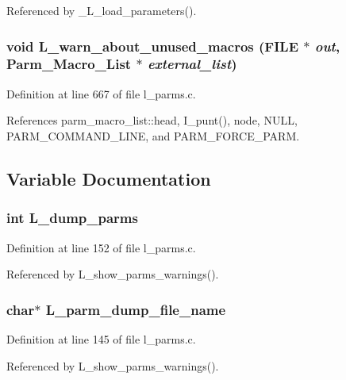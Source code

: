 Referenced by \_\-L\_\-load\_\-parameters().
\subsubsection{\setlength{\rightskip}{0pt plus 5cm}void L\_\-warn\_\-about\_\-unused\_\-macros (FILE $\ast$ {\em out}, \bf{Parm\_\-Macro\_\-List} $\ast$ {\em external\_\-list})}\label{l__parms_8h_da9f209c373bf33ecc8affd7d376b2d3}




Definition at line 667 of file l\_\-parms.c.

References parm\_\-macro\_\-list::head, I\_\-punt(), node, NULL, PARM\_\-COMMAND\_\-LINE, and PARM\_\-FORCE\_\-PARM.

\subsection{Variable Documentation}
\subsubsection{\setlength{\rightskip}{0pt plus 5cm}int \bf{L\_\-dump\_\-parms}}\label{l__parms_8h_d8b6ae8bcbc9ccc867100dfd96f6957c}




Definition at line 152 of file l\_\-parms.c.

Referenced by L\_\-show\_\-parms\_\-warnings().
\subsubsection{\setlength{\rightskip}{0pt plus 5cm}char$\ast$ \bf{L\_\-parm\_\-dump\_\-file\_\-name}}\label{l__parms_8h_3b83d33abb46fadfb813372c0b9a667f}




Definition at line 145 of file l\_\-parms.c.

Referenced by L\_\-show\_\-parms\_\-warnings().
